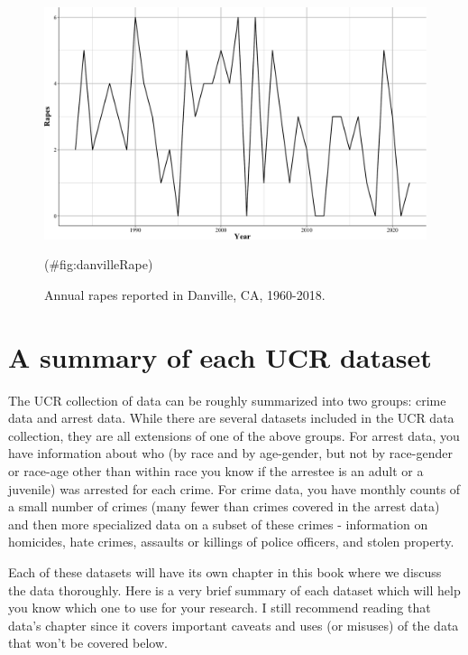 \documentclass[
  12pt,
  openany]{book}
\begin{document}
\begin{figure}

{\centering \includegraphics[width=0.9\linewidth]{ucrbook_files/figure-latex/danvilleRape-1} 

}

\caption{Annual rapes reported in Danville, CA, 1960-2018.}(\#fig:danvilleRape)
\end{figure}

\hypertarget{a-summary-of-each-ucr-dataset}{%
\section{A summary of each UCR dataset}\label{a-summary-of-each-ucr-dataset}}

The UCR collection of data can be roughly summarized into two groups: crime data and arrest data. While there are several datasets included in the UCR data collection, they are all extensions of one of the above groups. For arrest data, you have information about who (by race and by age-gender, but not by race-gender or race-age other than within race you know if the arrestee is an adult or a juvenile) was arrested for each crime. For crime data, you have monthly counts of a small number of crimes (many fewer than crimes covered in the arrest data) and then more specialized data on a subset of these crimes - information on homicides, hate crimes, assaults or killings of police officers, and stolen property.

Each of these datasets will have its own chapter in this book where we discuss the data thoroughly. Here is a very brief summary of each dataset which will help you know which one to use for your research. I still recommend reading that data's chapter since it covers important caveats and uses (or misuses) of the data that won't be covered below.
\end{document}
